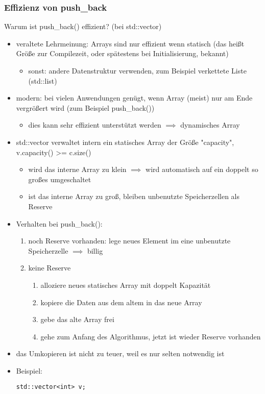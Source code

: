 \documentclass[a4paper]{scrartcl}
\theoremstyle{definition}
\theoremstyle{plain}
\theoremstyle{remark}
\theoremstyle{remark}
\begin{document}
\subsubsection{Effizienz von push\_back}
\label{sec-11-1-1}
Warum ist push\_back() effizient? (bei std::vector)
\begin{itemize}
\item veraltete Lehrmeinung: Arrays sind nur effizient wenn statisch (das heißt Größe zur Compilezeit, oder spätestens bei Initialisierung, bekannt)
\begin{itemize}
\item sonst: andere Datenstruktur verwenden, zum Beispiel verkettete Liste (std::list)
\end{itemize}
\item modern: bei vielen Anwendungen genügt, wenn Array (meist) nur am Ende vergrößert wird (zum Beispiel push\_back())
\begin{itemize}
\item dies kann sehr effizient unterstützt werden $\implies$ dynamisches Array
\end{itemize}
\item std::vector verwaltet intern ein statisches Array der Größe "capacity", v.capacity() >= c.size()
\begin{itemize}
\item wird das interne Array zu klein $\implies$ wird automatisch auf ein doppelt so großes umgeschaltet
\item ist das interne Array zu groß, bleiben unbenutzte Speicherzellen als Reserve
\end{itemize}
\item Verhalten bei push\_back():
\begin{enumerate}
\item noch Reserve vorhanden: lege neues Element im eine unbenutzte Speicherzelle $\implies$ billig
\item keine Reserve
\begin{enumerate}
\item alloziere neues statisches Array mit doppelt Kapazität
\item kopiere die Daten aus dem altem in das neue Array
\item gebe das alte Array frei
\item gehe zum Anfang des Algorithmus, jetzt ist wieder Reserve vorhanden
\end{enumerate}
\end{enumerate}
\item das Umkopieren ist nicht zu teuer, weil es nur selten notwendig ist
\item Beispiel:
\begin{verbatim}
std::vector<int> v;


\end{verbatim}
\end{itemize}
\end{document}
